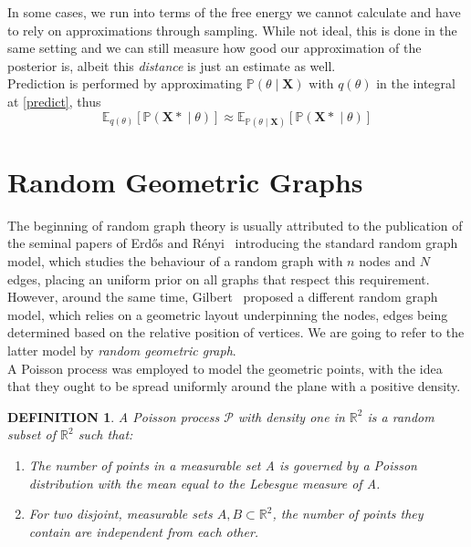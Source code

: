 \documentclass[12pt]{report}
\newtheorem{definition}[theorem]{DEFINITION}
\newcommand{\bs}{\boldsymbol}
\newcommand{\mc}[1]{\mathcal{#1}}
\newcommand{\mb}[1]{\mathbb{#1}}
\newcommand{\E}{\mathbb{E}}
\renewcommand{\P}{\mathbb{P}}
\renewcommand{\bs}{\boldsymbol}
\begin{document}
\noindent
In some cases, we run into terms of the free energy we cannot calculate and have to rely on approximations through sampling. While not ideal, this is done in the same setting and we can still measure how good our approximation of the posterior is, albeit this \textit{distance} is just an estimate as well. \\

\noindent
Prediction is performed by approximating $\P(\theta \mid \bs{X})$ with $q(\theta)$ in the integral at \ref{predict}, thus
\begin{equation}
    \E_{q(\theta)}[\P(\bs{X*} \mid \theta)] \approx \E_{\P(\theta \mid \bs{X})}[\P(\bs{X*} \mid \theta)]
\end{equation}

\section{Random Geometric Graphs}\label{sec:rgg}
The beginning of random graph theory is usually attributed to the publication of the seminal papers of Erd\H{o}s and R\'{e}nyi~\parencite{erdos1, erdos2, erdos3} introducing the standard random graph model, which studies the behaviour of a random graph with $n$ nodes and $N$ edges, placing an uniform prior on all graphs that respect this requirement. However, around the same time, Gilbert~\parencite{rgg} proposed a different random graph model, which relies on a geometric layout underpinning the nodes, edges being determined based on the relative position of vertices. We are going to refer to the latter model by \textit{random geometric graph}. \\

A Poisson process was employed to model the geometric points, with the idea that they ought to be spread uniformly around the plane with a positive density. \\

\begin{definition}
    A Poisson process $\mc{P}$ with density one in $\mb{R}^2$ is a random subset of $\mb{R}^2$ such that:
    \begin{enumerate}
        \item The number of points in a measurable set A is governed by a Poisson distribution with the mean equal to the Lebesgue measure of A.
        \item For two disjoint, measurable sets $A, B \subset \mb{R}^2$, the number of points they contain are independent from each other.
    \end{enumerate}
\end{definition}
\end{document}
